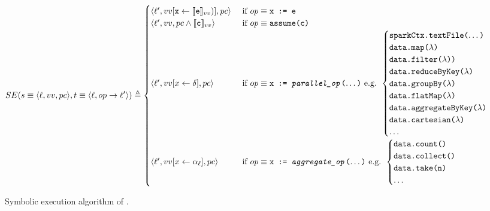 \begin{figure}
	\newcommand{\code}[1]{ \text{\texttt{#1}}}
	\tiny
	\[SE(s\equiv\langle \ell, vv, pc\rangle, t\equiv\langle \ell, op \rightarrow \ell'\rangle) \triangleq 
	\begin{cases}
	
	\langle \ell', vv[\code{x} \gets \llbracket \code{e}\rrbracket_{vv})], pc\rangle
	& \text{ if } 
	op \equiv \code{x := e}\\
	
	\langle \ell', vv, pc \wedge \llbracket \code{c}\rrbracket_{vv}\rangle
	& \text{ if } 
	op \equiv \code{assume(c)}\\
	
	\langle \ell', vv[x \gets \delta], pc\rangle
	& \text{ if } 
	op \equiv \code{x := \textit{parallel\_op}($\dots$)} \text{ e.g. }
	\begin{cases}
	\code{sparkCtx.textFile($\dots$)}\\ %
	\code{data.map($\lambda$)}\\ \code{data.filter(\textit{$\lambda$}))}\\ \code{data.reduceByKey(\textit{$\lambda$})}\\ \code{data.groupBy($\lambda$)}\\ \code{data.flatMap($\lambda$)}\\ \code{data.aggregateByKey($\lambda$)}\\ \code{data.cartesian($\lambda$)}\\ 
	\dots
	\end{cases}\\
	
	
	\langle \ell', vv[x \gets \alpha_\ell], pc\rangle
	& \text{ if } 
	op \equiv \code{x := \textit{aggregate\_op}($\dots$)}  \text{ e.g. }
	\begin{cases}
	\code{data.count()}\\ \code{data.collect()}\\ \code{data.take(n)}\\ \dots
	\end{cases}\\
	
	\end{cases}
	\]
	
	\caption{Symbolic execution algorithm of \approach.}
	\label{fig:symbex}
	\normalsize
\end{figure}

